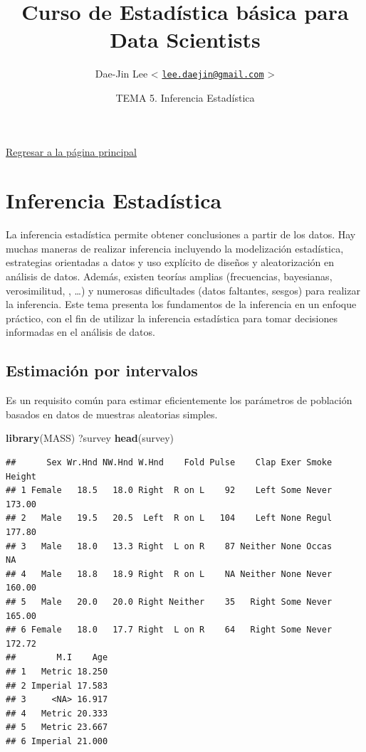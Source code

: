 \documentclass[]{article}
\title{\textbf{Curso de Estadística básica para Data Scientists}}
\author{Dae-Jin Lee \textless{}
\href{mailto:lee.daejin@gmail.com}{\nolinkurl{lee.daejin@gmail.com}}
\textgreater{}}
\date{TEMA 5. Inferencia Estadística}
\newenvironment{Shaded}{\begin{snugshade}}{\end{snugshade}}
\newcommand{\KeywordTok}[1]{\textcolor[rgb]{0.13,0.29,0.53}{\textbf{{#1}}}}
\newcommand{\NormalTok}[1]{{#1}}
\numberwithin{equation}{section}
\begin{document}
\maketitle

{
\hypersetup{linkcolor=black}
\setcounter{tocdepth}{2}
\tableofcontents
}
\newpage

\href{https://idaejin.github.io/bcam-courses/R/datahack/}{Regresar a la
página principal}

\section{Inferencia Estadística}\label{inferencia-estadistica}

La inferencia estadística permite obtener conclusiones a partir de los
datos. Hay muchas maneras de realizar inferencia incluyendo la
modelización estadística, estrategias orientadas a datos y uso explícito
de diseños y aleatorización en análisis de datos. Además, existen
teorías amplias (frecuencias, bayesianas, verosimilitud, , \ldots{}) y
numerosas dificultades (datos faltantes, sesgos) para realizar la
inferencia. Este tema presenta los fundamentos de la inferencia en un
enfoque práctico, con el fin de utilizar la inferencia estadística para
tomar decisiones informadas en el análisis de datos.

\subsection{Estimación por intervalos}\label{estimacion-por-intervalos}

Es un requisito común para estimar eficientemente los parámetros de
población basados en datos de muestras aleatorias simples.

\begin{Shaded}
\begin{Highlighting}[]
\KeywordTok{library}\NormalTok{(MASS)}
\NormalTok{?survey}
\KeywordTok{head}\NormalTok{(survey)}
\end{Highlighting}
\end{Shaded}

\begin{verbatim}
##      Sex Wr.Hnd NW.Hnd W.Hnd    Fold Pulse    Clap Exer Smoke Height
## 1 Female   18.5   18.0 Right  R on L    92    Left Some Never 173.00
## 2   Male   19.5   20.5  Left  R on L   104    Left None Regul 177.80
## 3   Male   18.0   13.3 Right  L on R    87 Neither None Occas     NA
## 4   Male   18.8   18.9 Right  R on L    NA Neither None Never 160.00
## 5   Male   20.0   20.0 Right Neither    35   Right Some Never 165.00
## 6 Female   18.0   17.7 Right  L on R    64   Right Some Never 172.72
##        M.I    Age
## 1   Metric 18.250
## 2 Imperial 17.583
## 3     <NA> 16.917
## 4   Metric 20.333
## 5   Metric 23.667
## 6 Imperial 21.000
\end{verbatim}
\end{document}
